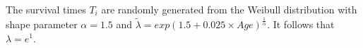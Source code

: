 \documentclass[12pt,letterpaper]{article}
\begin{document}
The survival times $T_i$ are randomly generated from the Weibull distribution with shape parameter $\alpha=1.5$ and $\tilde{\lambda}=exp(1.5 +0.025 \times Age)^{\frac{1}{\alpha}}$.  It follows that $\lambda = e^1$.

%
%
%
%
%
%
%
\end{document}
